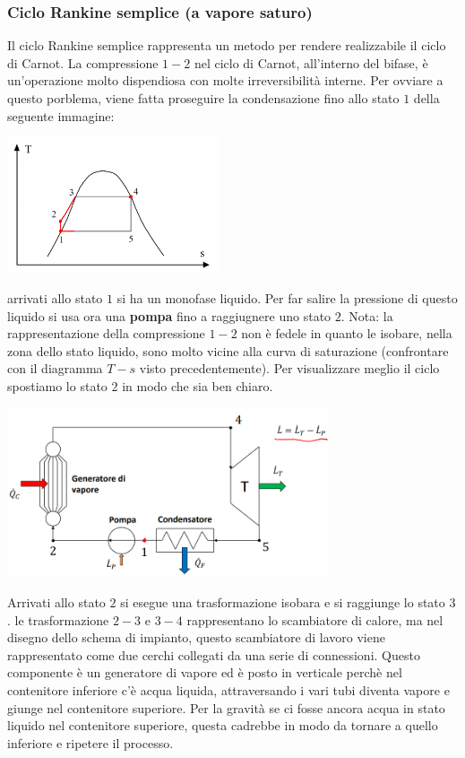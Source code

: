 \subsubsection{Ciclo Rankine semplice (a vapore saturo)}
Il ciclo Rankine semplice rappresenta un metodo per rendere realizzabile il ciclo di Carnot. La compressione $1-2$ nel ciclo di Carnot, all'interno del bifase, è un'operazione molto dispendiosa con molte irreversibilità interne. Per ovviare a questo porblema, viene fatta proseguire la condensazione fino allo stato $1$ della seguente immagine:
\begin{center}
    \includegraphics[height=4cm]{../L08/img5.PNG}
\end{center}
arrivati allo stato $1$ si ha un monofase liquido. Per far salire la pressione di questo liquido si usa ora una \textbf{pompa} fino a raggiugnere uno stato $2$.\newline
Nota: la rappresentazione della compressione $1-2$ non è fedele in quanto le isobare, nella zona dello stato liquido, sono molto vicine alla curva di saturazione (confrontare con il diagramma $T-s$ visto precedentemente). Per visualizzare meglio il ciclo spostiamo lo stato $2$ in modo che sia ben chiaro.
\begin{center}
    \includegraphics[height=5cm]{../L08/img6.PNG}
\end{center}
Arrivati allo stato $2$ si esegue una trasformazione isobara e si raggiunge lo stato $3$. le trasformazione $2-3$ e $3-4$ rappresentano lo scambiatore di calore, ma nel disegno dello schema di impianto, questo scambiatore di lavoro viene rappresentato come due cerchi collegati da una serie di connessioni. Questo componente è un generatore di vapore ed è posto in verticale perchè nel contenitore inferiore c'è acqua liquida, attraversando i vari tubi diventa vapore e giunge nel contenitore superiore. Per la gravità se ci fosse ancora acqua in stato liquido nel contenitore superiore, questa cadrebbe in modo da tornare a quello inferiore e ripetere il processo.\newline
